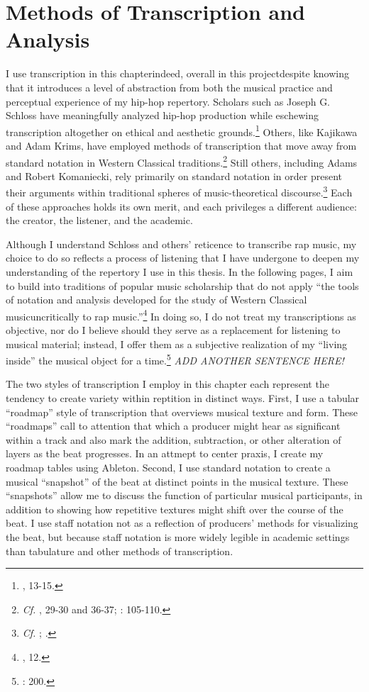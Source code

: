 \doublespacing
\section{Methods of Transcription and Analysis}
I use transcription in this chapter\textemdash indeed, overall in this project\textemdash despite knowing that it introduces a level of abstraction from both the musical practice and perceptual experience of my hip-hop repertory. Scholars such as Joseph G. Schloss have meaningfully analyzed hip-hop production while eschewing transcription altogether on ethical and aesthetic grounds.\footnote{\cite{josephgschlossMakingBeatsArt2004}, 13-15.} Others, like Kajikawa and Adam Krims, have employed methods of transcription that move away from standard notation in Western Classical traditions.\footnote{\textit{Cf.} \cite{lorenkajikawaSoundingRaceRap2015}, 29-30 and 36-37; \cite{adamkrimsRapMusicPoetics2000}: 105-110.} Still others, including Adams and Robert Komaniecki, rely primarily on standard notation in order present their arguments within traditional spheres of music-theoretical discourse.\footnote{\textit{Cf. }\cite{kyleadamsMetricalTechniquesFlow2009}; \cite{robertkomanieckiAnalyzingCollaborativeFlow2017}.} Each of these approaches holds its own merit, and each privileges a different audience: the creator, the listener, and the academic.

Although I understand Schloss and others' reticence to transcribe rap music, my choice to do so reflects a process of listening that I have undergone to deepen my understanding of the repertory I use in this thesis. In the following pages, I aim to build into traditions of popular music scholarship that do not apply ``the tools of notation and analysis developed for the study of Western Classical music\textellipsis uncritically to rap music.''\footnote{\cite{lorenkajikawaSoundingRaceRap2015}, 12.}  In doing so, I do not treat my transcriptions as objective, nor do I believe should they serve as a replacement for listening to musical material; instead, I offer them as a subjective realization of my ``living inside'' the musical object for a time.\footnote{\cite{peterwinklerWritingGhostNotes1997}: 200.} \textit{ADD ANOTHER SENTENCE HERE!}

The two styles of transcription I employ in this chapter each represent the tendency to create variety within reptition in distinct ways. First, I use a tabular “roadmap” style of transcription that overviews musical texture and form. These ``roadmaps'' call to attention that which a producer might hear as significant within a track and also mark the addition, subtraction, or other alteration of layers as the beat progresses. In an attmept to center praxis, I create my roadmap tables using Ableton. Second, I use standard notation to create a musical ``snapshot'' of the beat at distinct points in the musical texture. These ``snapshots'' allow me to discuss the function of particular musical participants, in addition to showing how repetitive textures might shift over the course of the beat. I use staff notation not as a reflection of producers' methods for visualizing the beat, but because staff notation is more widely legible in academic settings than tabulature and other methods of transcription.

